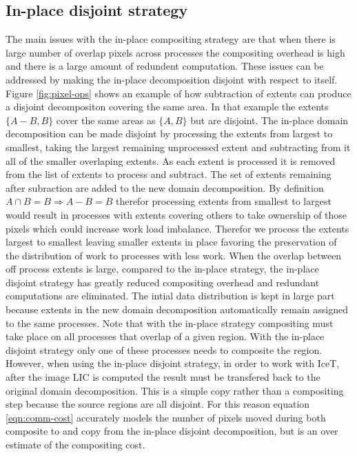 \documentclass[a4paper,10pt]{article}
\begin{document}
\subsection{In-place disjoint strategy}
The main issues with the in-place compositing strategy are that when there is large number of overlap pixels across processes the compositing overhead is high and there is a large amount of redundent computation. These issues can be addressed by making the in-place decomposition disjoint with respect to itself. Figure \ref{fig:pixel-ops} shows an example of how subtraction of extents can produce a disjoint decompositon covering the same area. In that example the extents $\{A-B, B\}$ cover the same areas as $\{A, B\}$ but are disjoint. The in-place domain decomposition can be made disjoint by processing the extents from largest to smallest, taking the largest remaining unprocessed extent and subtracting from it all of the smaller overlaping extents. As each extent is processed it is removed from the list of extents to process and subtract. The set of extents remaining after subraction are added to the new domain decomposition. By definition $A \cap B = B \Rightarrow A - B = B$ therefor processing extents from smallest to largest would result in processes with extents covering others to take ownership of those pixels which could increase work load imbalance. Therefor we process the extents largest to smallest leaving smaller extents in place favoring the preservation of the distribution of work to processes with less work. When the overlap between off process extents is large, compared to the in-place strategy, the in-place disjoint strategy has greatly reduced compositing overhead and redundant computations are eliminated. The intial data distribution is kept in large part because extents in the new domain decomposition automatically remain assigned to the same processes. Note that with the in-place strategy compositing must take place on all processes that overlap of a given region. With the in-place disjoint strategy only one of these processes needs to composite the region. However, when using the in-place disjoint strategy, in order to work with IceT, after the image LIC is computed the result must be transfered back to the original domain decomposition. This is a simple copy rather than a compositing step because the source regions are all disjoint. For this reason equation \ref{eqn:comm-cost} accurately models the number of pixels moved during both composite to and copy from the in-place disjoint decomposition, but is an over estimate of the compositing cost. 
\end{document}
